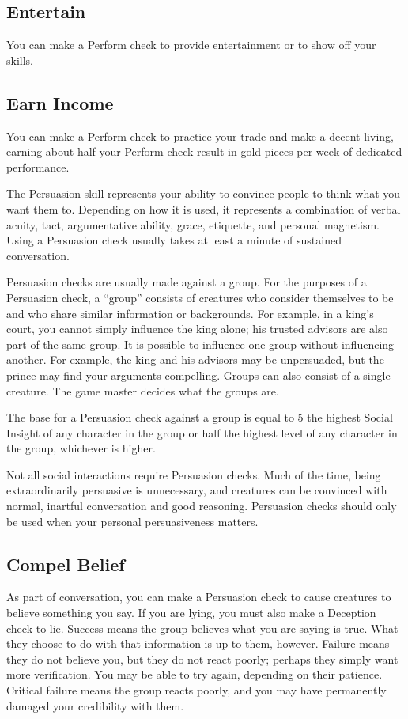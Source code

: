     \subsection{Entertain}
        You can make a Perform check to provide entertainment or to show off your skills.

    \subsection{Earn Income}
        You can make a Perform check to practice your trade and make a decent living, earning about half your Perform check result in gold pieces per week of dedicated performance.

\newpage
{}
        The Persuasion skill represents your ability to convince people to think what you want them to.
        Depending on how it is used, it represents a combination of verbal acuity, tact, argumentative ability, grace, etiquette, and personal magnetism.
        Using a Persuasion check usually takes at least a minute of sustained conversation.

        Persuasion checks are usually made against a group. For the purposes of a Persuasion check, a ``group'' consists of creatures who consider themselves to be  and who share similar information or backgrounds. For example, in a king's court, you cannot simply influence the king alone; his trusted advisors are also part of the same group. It is possible to influence one group without influencing another. For example, the king and his advisors may be unpersuaded, but the prince may find your arguments compelling. Groups can also consist of a single creature. The game master decides what the groups are.

        The base  for a Persuasion check against a group is equal to 5 \add the highest Social Insight of any character in the group or half the highest level of any character in the group, whichever is higher.

        Not all social interactions require Persuasion checks. Much of the time, being extraordinarily persuasive is unnecessary, and creatures can be convinced with normal, inartful conversation and good reasoning. Persuasion checks should only be used when your personal persuasiveness matters.

    \subsection{Compel Belief}\label{Compel Belief}
        As part of conversation, you can make a Persuasion check to cause creatures to believe something you say. If you are lying, you must also make a Deception check to lie. Success means the group believes what you are saying is true. What they choose to do with that information is up to them, however. Failure means they do not believe you, but they do not react poorly; perhaps they simply want more verification. You may be able to try again, depending on their patience. Critical failure means the group reacts poorly, and you may have permanently damaged your credibility with them.

